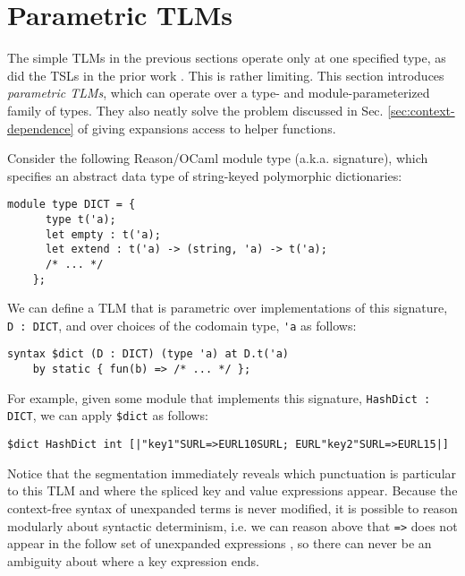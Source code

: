 \documentclass[acmsmall,review,anonymous]{acmart}\settopmatter{printfolios=true,printccs=false,printacmref=false}
\newcommand{\li}[1]{\lstinline[basicstyle=\ttfamily\fontsize{9pt}{1em}\selectfont]{#1}}
\begin{document}
\newcommand{\pTLMsSec}{Parametric TLMs}
\section{\protect\pTLMsSec}
\label{sec:ptsms}

The simple TLMs in the previous sections operate only at one specified type, as did the TSLs in the prior work \cite{TSLs}. This is rather limiting. This section introduces \emph{parametric TLMs}, which can operate over a type- and module-parameterized family of types. They also neatly solve the problem discussed in Sec. \ref{sec:context-dependence} of giving expansions access to helper functions.

Consider the following Reason/OCaml module type (a.k.a. signature), which specifies an abstract data type \cite{liskov1974programming,harper1997programming} of string-keyed polymorphic dictionaries:
\begin{lstlisting}[numbers=none]
    module type DICT = {
      type t('a); 
      let empty : t('a); 
      let extend : t('a) -> (string, 'a) -> t('a); 
      /* ... */ 
    };
\end{lstlisting}
We can define a TLM that is parametric over implementations of this signature, \li{D : DICT}, and over choices of the codomain type, \li{'a} as follows:
\begin{lstlisting}[numbers=none]
    syntax $dict (D : DICT) (type 'a) at D.t('a) 
    by static { fun(b) => /* ... */ };
\end{lstlisting}
For example, given some module that implements this signature, \li{HashDict : DICT}, we can apply \li{$dict} as follows:
\begin{lstlisting}[numbers=none]
    $dict HashDict int [|"key1"SURL=>EURL10SURL; EURL"key2"SURL=>EURL15|]
\end{lstlisting}
Notice that the segmentation immediately reveals which punctuation is particular to this TLM and where the spliced key and value expressions appear. Because the context-free syntax of unexpanded terms is never modified, it is possible to reason modularly about syntactic determinism, i.e. we can reason above that \li{=>} does not appear in the follow set of unexpanded expressions \cite{conf/pldi/SchwerdfegerW09}, so there can never be an ambiguity about where a key expression ends.
\end{document}
